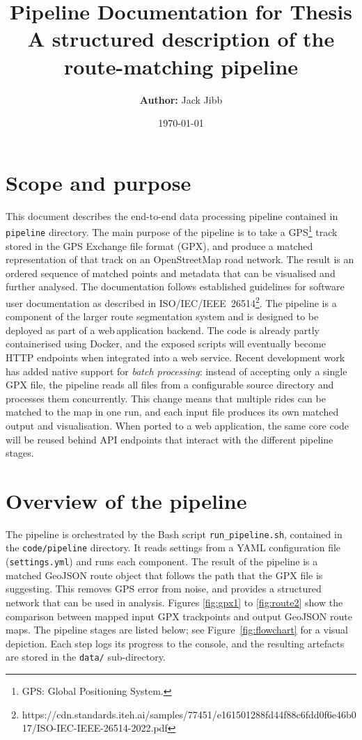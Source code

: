 \documentclass[11pt,a4paper]{article}
\title{Pipeline Documentation for Thesis \\[0.5em]
\large A structured description of the route-matching pipeline}
\author{\textbf{Author:} Jack Jibb}
\date{\today}
\begin{document}
\maketitle

\section*{Scope and purpose}
This document describes the end-to-end data processing pipeline contained in \texttt{pipeline}
directory.  The main purpose of the pipeline is to take a
GPS\footnote{GPS: Global Positioning System.} track stored in the GPS Exchange file
format (GPX), and produce a matched representation of that track on an
OpenStreetMap road network.  The result is an ordered sequence of matched
points and metadata that can be visualised and further analysed.  The
documentation follows established guidelines for software user documentation as
described in ISO/IEC/IEEE~26514\footnote{https://cdn.standards.iteh.ai/samples/77451/e161501288fd44f88c6fdd0f6e46b017/ISO-IEC-IEEE-26514-2022.pdf}.
The pipeline is a component of the larger route segmentation system and is designed to
be deployed as part of a web\,application backend. The code is already partly containerised
using Docker, and the exposed scripts will eventually become HTTP endpoints when integrated
into a web service. Recent development work has added native support for \emph{batch processing}:
instead of accepting only a single GPX file, the pipeline reads all files from a configurable
source directory and processes them concurrently.  This change means that multiple rides can be
matched to the map in one run, and each input file produces its own matched output and visualisation.
When ported to a web application, the same core code will be reused behind API endpoints that
interact with the different pipeline stages.

\section{Overview of the pipeline}
The pipeline is orchestrated by the Bash script \texttt{run\_pipeline.sh}, contained
in the \texttt{code/pipeline} directory. It reads settings from a YAML configuration file (\texttt{settings.yml})
and runs each component. The result of the pipeline is a matched GeoJSON route object that follows the path
that the GPX file is suggesting. This removes GPS error from noise, and provides a structured network that can be used in analysis.
Figures \ref{fig:gpx1} to \ref{fig:route2} show the comparison between mapped input GPX trackpoints and output GeoJSON route maps.
The pipeline stages are listed below; see
Figure~\ref{fig:flowchart} for a visual depiction.  Each step logs its
progress to the console, and the resulting artefacts are stored in the
\texttt{data/} sub-directory.
\end{document}
